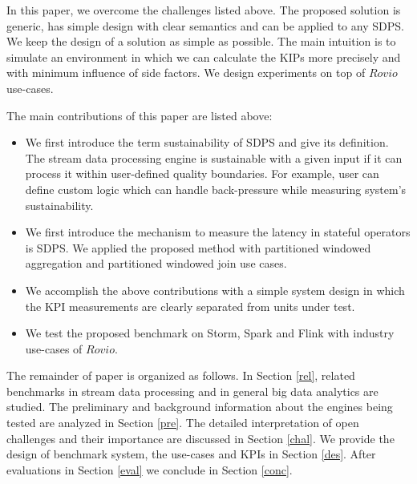 In this paper, we overcome the challenges listed above. The proposed solution is generic, has simple design with clear semantics and can be applied to any SDPS. We keep the design of a solution as simple as possible. The main intuition is to simulate an environment in which we can calculate the KIPs more precisely and with minimum influence of side factors. We design experiments on top of $Rovio$ use-cases.

The main contributions of this paper are listed above:
\begin{itemize}  
\item We first introduce the term sustainability of SDPS and give its definition. The stream data processing engine is sustainable with a given input if it can process it within user-defined quality boundaries.  For example, user can define custom logic which can handle back-pressure while measuring system's sustainability. 
\item  We first  introduce  the mechanism to measure the latency in stateful operators is SDPS. We applied the proposed method with partitioned windowed aggregation and partitioned windowed join use cases. 
\item We accomplish the above contributions with a simple system design in which the KPI measurements are clearly separated from units under test. 
\item We test the proposed benchmark on Storm, Spark and Flink with industry use-cases of $Rovio$.
\end{itemize}

The remainder of paper is organized as follows. In Section \ref{rel}, related benchmarks in stream data processing and in general big data analytics are studied. The preliminary and background information about the engines being tested are analyzed in Section \ref{pre}. The detailed interpretation of open challenges  and their importance are discussed in Section \ref{chal}. We provide the design of benchmark system, the use-cases and KPIs in Section \ref{des}. After evaluations in Section \ref{eval} we conclude in Section \ref{conc}.
